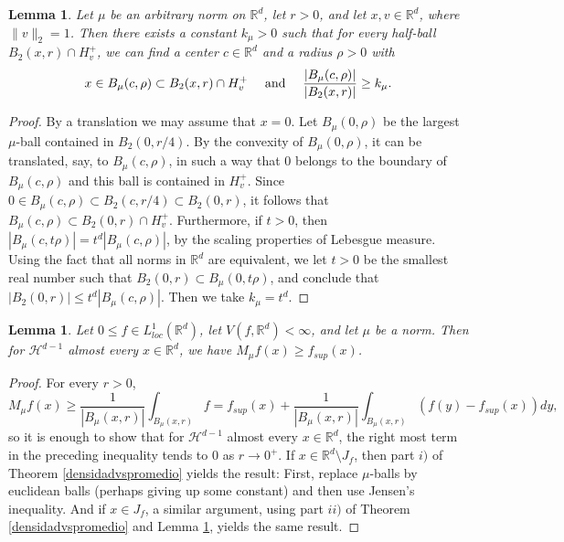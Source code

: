 \documentclass[12pt]{amsart}
\numberwithin{equation}{section}
\theoremstyle{plain}
\newtheorem{lemma}[theorem]{Lemma}
\theoremstyle{definition}
\theoremstyle{remark}
\begin{document}
\begin{lemma}\label{conl3}
  Let
  $\mu$ be an arbitrary norm on $\mathbb{R}^d$, let $r>0$, and let
  $x,v\in\mathbb{R}^d$, where $\|v\|_2=1$. Then there exists a constant $k_\mu>0$ such
   that for every half-ball $B_2 (x,r)\cap H_v^+$,
  we can find a center $c\in\mathbb{R}^d$ and a radius $\rho>0$ with
  \begin{equation*}
    x\in B_\mu(c,\rho)\subset B_2(x,r)\cap H_v^+ \quad\textnormal{ and
    }\quad\frac{|B_\mu(c,\rho)|}{|B_2(x,r)|}\ge k_\mu.
  \end{equation*}
\end{lemma}
\begin{proof}
By a translation we may assume that $x = 0$. Let $B_\mu (0,\rho)$
be the largest $\mu$-ball contained in $B_2 (0,r/4)$. By the convexity
of $B_\mu (0,\rho)$, it can be translated, say, to $B_\mu (c,\rho)$,
in such a way that $0$ belongs to the boundary of $B_\mu (c,\rho)$
and this ball is contained in $H_v^+$. Since
$0\in B_\mu (c,\rho)\subset B_2 (c, r/4) \subset B_2 (0, r)$,
it follows that $B_\mu (c,\rho)\subset B_2 (0,r)\cap H_v^+$. Furthermore,
if $t > 0$, then $|B_\mu (c, t \rho)| = t^d |B_\mu (c, \rho)|$,
by the scaling properties of Lebesgue measure. Using the fact that
all norms in $\mathbb{R}^d$ are equivalent, we let $t>0$
be the smallest real number such that $B_2 (0, r)\subset B_\mu (0, t \rho)$,
and conclude that $|B_2 (0, r)| \le t^d |B_\mu (c, \rho)|$. Then we take $k_\mu = t^d$.
\end{proof}

\begin{lemma}\label{conl2}
  Let  $0 \le f\in L^1_{loc}(\mathbb{R}^d)$, let
   $V(f,\mathbb{R}^d)<\infty$, and let
  $\mu$ be a norm.
  Then for
  $\mathcal{H}^{d-1}$ almost every $x\in\mathbb{R}^d$, we have $M_\mu f(x)\ge
  f_{sup}(x)$.
\end{lemma}
\begin{proof} For every $r>0$,
  \begin{equation*}
    M_\mu f(x)\ge \frac{1}{|B_\mu(x,r)|}\int_{B_\mu(x,r)}f=
    f_{sup}(x) +
    \frac{1}{|B_\mu(x,r)|}\int_{B_\mu(x,r)}(f(y)-f_{sup}(x))dy,
  \end{equation*}
so it is enough to show that for
  $\mathcal{H}^{d-1}$ almost every $x\in\mathbb{R}^d$,  the right
  most term in the preceding inequality tends to $0$ as
  $r\rightarrow 0^+$. If $x\in\mathbb{R}^d\setminus J_f$, then part
$i)$  of Theorem \ref{densidadvspromedio} yields the result: First,
replace $\mu$-balls by euclidean balls (perhaps giving up some constant) and
then use Jensen's inequality. And if $x\in J_f$, a similar argument, using
part $ii)$  of Theorem \ref{densidadvspromedio} and Lemma \ref{conl3}, yields the same result.
\end{proof}
\end{document}
